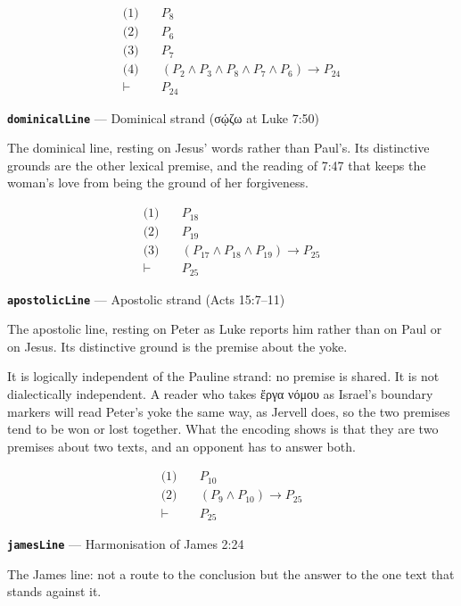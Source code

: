 \documentclass[11pt]{article}
\begin{document}
\begin{align*}
  \text{(1)} \quad & P_{8} \\
  \text{(2)} \quad & P_{6} \\
  \text{(3)} \quad & P_{7} \\
  \text{(4)} \quad & (P_{2} \land P_{3} \land P_{8} \land P_{7} \land P_{6}) \rightarrow P_{24} \\
  \vdash \quad & P_{24}
\end{align*}
\par\medskip\noindent\textbf{\texttt{dominical\allowbreak{}Line}} --- Dominical strand (σῴζω at Luke 7:50)\par\nobreak\noindent
The dominical line, resting on Jesus' words rather than Paul's. Its distinctive grounds are the other lexical premise, and the reading of 7:47 that keeps the woman's love from being the ground of her forgiveness.

\begin{align*}
  \text{(1)} \quad & P_{18} \\
  \text{(2)} \quad & P_{19} \\
  \text{(3)} \quad & (P_{17} \land P_{18} \land P_{19}) \rightarrow P_{25} \\
  \vdash \quad & P_{25}
\end{align*}
\par\medskip\noindent\textbf{\texttt{apostolic\allowbreak{}Line}} --- Apostolic strand (Acts 15:7–11)\par\nobreak\noindent
The apostolic line, resting on Peter as Luke reports him rather than on Paul or on Jesus. Its distinctive ground is the premise about the yoke.

It is logically independent of the Pauline strand: no premise is shared. It is not dialectically independent. A reader who takes ἔργα νόμου as Israel's boundary markers will read Peter's yoke the same way, as Jervell does, so the two premises tend to be won or lost together. What the encoding shows is that they are two premises about two texts, and an opponent has to answer both.

\begin{align*}
  \text{(1)} \quad & P_{10} \\
  \text{(2)} \quad & (P_{9} \land P_{10}) \rightarrow P_{25} \\
  \vdash \quad & P_{25}
\end{align*}
\par\medskip\noindent\textbf{\texttt{james\allowbreak{}Line}} --- Harmonisation of James 2:24\par\nobreak\noindent
The James line: not a route to the conclusion but the answer to the one text that stands against it.
\end{document}
